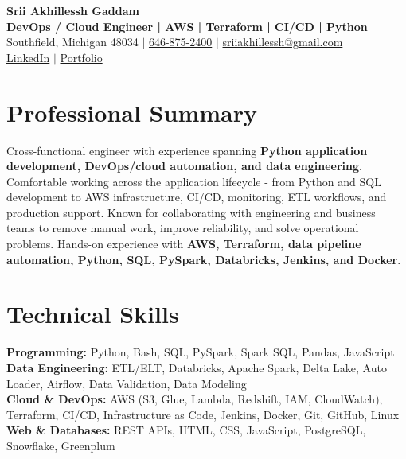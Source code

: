 \documentclass[letterpaper,10pt]{article}
\begin{document}
\fontsize{9.35pt}{10.45pt}\selectfont

\begin{center}
    {\LARGE \textbf{Srii Akhillessh Gaddam}} \\[-1pt]
    \textbf{DevOps / Cloud Engineer | AWS | Terraform | CI/CD | Python} \\[2pt]
    Southfield, Michigan 48034 $|$
    \href{tel:6468752400}{646-875-2400} $|$
    \href{mailto:sriiakhillessh@gmail.com}{sriiakhillessh@gmail.com} \\[1pt]
    \href{https://www.linkedin.com/in/srii-akhiilessh-gaddam-b48668191/}{LinkedIn} $|$
    \href{https://sriiakhillesshg.github.io/portfolio/}{Portfolio}
\end{center}
\vspace{-8pt}

\section{Professional Summary}
\small{Cross-functional engineer with experience spanning \textbf{Python application development, DevOps/cloud automation, and data engineering}. Comfortable working across the application lifecycle - from Python and SQL development to AWS infrastructure, CI/CD, monitoring, ETL workflows, and production support. Known for collaborating with engineering and business teams to remove manual work, improve reliability, and solve operational problems. Hands-on experience with \textbf{AWS, Terraform, data pipeline automation, Python, SQL, PySpark, Databricks, Jenkins, and Docker}.}

\section{Technical Skills}
\small{
\textbf{Programming:} Python, Bash, SQL, PySpark, Spark SQL, Pandas, JavaScript \\
\textbf{Data Engineering:} ETL/ELT, Databricks, Apache Spark, Delta Lake, Auto Loader, Airflow, Data Validation, Data Modeling \\
\textbf{Cloud \& DevOps:} AWS (S3, Glue, Lambda, Redshift, IAM, CloudWatch), Terraform, CI/CD, Infrastructure as Code, Jenkins, Docker, Git, GitHub, Linux \\
\textbf{Web \& Databases:} REST APIs, HTML, CSS, JavaScript, PostgreSQL, Snowflake, Greenplum
}
\end{document}
